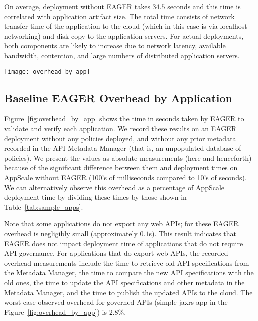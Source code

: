On average, deployment without EAGER takes $34.5$ seconds and this time 
is correlated with application artifact size.  The total time consists
of network transfer time of the application to the cloud (which in this 
case is via localhost networking) and disk copy to the application servers.
For actual deployments, both components are likely to increase due to network
latency, available bandwidth, contention, and large numbers of distributed
application servers.


\begin{figure*}
\centering
\texttt{[image: overhead\_by\_app]}
\caption{EAGER Absolute Overhead in Seconds by Application}
\label{fig:overhead_by_app}
\end{figure*}

\subsection{Baseline EAGER Overhead by Application}

Figure~\ref{fig:overhead_by_app} shows the time in seconds taken by EAGER to validate and 
verify each application.  We record these results on an EAGER deployment without any policies 
deployed, and without any prior metadata recorded in the API Metadata Manager 
(that is, an unpopulated database of policies).
We present the values as absolute measurements (here and henceforth) because
of the significant difference between them and 
deployment times on AppScale without EAGER (100's of milliseconds compared to 10's of seconds).  
We can alternatively observe this overhead as a 
percentage of AppScale deployment time by dividing these times by 
those shown in Table~\ref{tab:sample_apps}.

Note that some applications do not export any web APIs;
for these EAGER overhead is negligibly small (approximately $0.1$s). 
This result indicates that EAGER does not impact deployment time of applications 
that do not require API governance.  For applications that do
export web APIs, the recorded overhead measurements include the time
to retrieve old API specifications from the Metadata Manager, the time 
to compare the new API specifications with the old ones, the time to
update the API specifications and other metadata in the Metadata Manager, and
the time to publish the updated APIs to the cloud.  
The worst case observed overhead for governed APIs (simple-jaxrs-app in the
Figure~\ref{fig:overhead_by_app}) is 2.8\%.

